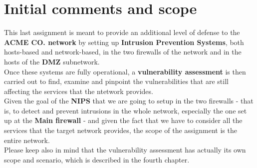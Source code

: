 \section{Initial comments and scope}
This last assignment is meant to provide an additional level of defense to the \textbf{ACME CO. network} by setting up \textbf{Intrusion Prevention Systems}, both hosts-based and network-based, in the two firewalls of the network and in the hosts of the \textbf{DMZ} subnetwork.\\
Once these systems are fully operational, a \textbf{vulnerability assessment} is then carried out to find, examine and pinpoint the vulnerabilities that are still affecting the services that the ntetwork provides.\\
Given the goal of the \textbf{NIPS} that we are going to setup in the two firewalls - that is, to detect and prevent intrusions in the whole network, especially the one set up at the \textbf{Main firewall} - and given the fact that we have to consider all the services that the target network provides, the scope of the assignment is the entire network.\\
Please keep also in mind that the vulnerability assessment has actually its own scope and scenario, which is described in the fourth chapter.\\
